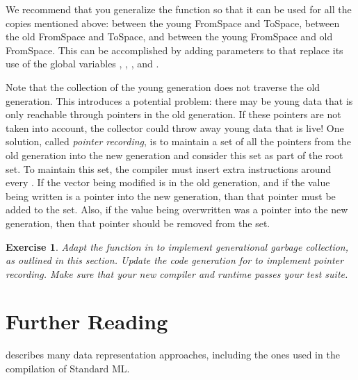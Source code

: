 \documentclass[7x10,nocrop]{TimesAPriori_MIT}%
\newtheorem{exercise}[theorem]{Exercise}
\begin{document}
{We recommend that you generalize the  function so that it
can be used for all the copies mentioned above: between the young
FromSpace and ToSpace, between the old FromSpace and ToSpace, and
between the young FromSpace and old FromSpace. This can be
accomplished by adding parameters to  that replace its
use of the global variables ,
, , and .

Note that the collection of the young generation does not traverse the
old generation. This introduces a potential problem: there may be
young data that is only reachable through pointers in the old
generation. If these pointers are not taken into account, the
collector could throw away young data that is live!  One solution,
called \emph{pointer recording}, is to maintain a set of all the
pointers from the old generation into the new generation and consider
this set as part of the root set.  To maintain this set, the compiler
must insert extra instructions around every . If the
vector being modified is in the old generation, and if the value being
written is a pointer into the new generation, than that pointer must
be added to the set. Also, if the value being overwritten was a
pointer into the new generation, then that pointer should be removed
from the set.

\begin{exercise}\normalfont\normalsize
  Adapt the  function in  to implement
  generational garbage collection, as outlined in this section.
  Update the code generation for  to implement
  pointer recording. Make sure that your new compiler and runtime
  passes your test suite.
\end{exercise}

\fi}

\section{Further Reading}

\citet{Appel90} describes many data representation approaches,
including the ones used in the compilation of Standard ML.
\end{document}
